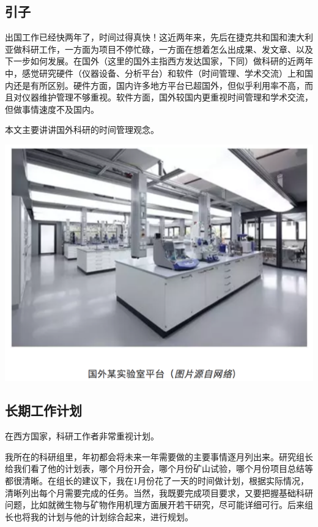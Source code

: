 \documentclass[
]{book}
\begin{document}
\hypertarget{ux5f15ux5b50}{%
\subsection{引子}\label{ux5f15ux5b50}}

出国工作已经快两年了，时间过得真快！这近两年来，先后在捷克共和国和澳大利亚做科研工作，一方面为项目不停忙碌，一方面在想着怎么出成果、发文章、以及下一步如何发展。在国外（这里的国外主指西方发达国家，下同）做科研的近两年中，感觉研究硬件（仪器设备、分析平台）和软件（时间管理、学术交流）上和国内还是有所区别。硬件方面，国内许多地方平台已超国外，但似乎利用率不高，而且对仪器维护管理不够重视。软件方面，国外较国内更重视时间管理和学术交流，但做事情速度不及国内。

本文主要讲讲国外科研的时间管理观念。

\includegraphics[width=8.33in]{images/osre1}

\hypertarget{ux957fux671fux5de5ux4f5cux8ba1ux5212}{%
\subsection{长期工作计划}\label{ux957fux671fux5de5ux4f5cux8ba1ux5212}}

在西方国家，科研工作者非常重视计划。

我所在的科研组里，年初都会将未来一年需要做的主要事情逐月列出来。研究组长给我们看了他的计划表，哪个月份开会，哪个月份矿山试验，哪个月份项目总结等都很清晰。在组长的建议下，我在1月份花了一天的时间做计划，根据实际情况，清晰列出每个月需要完成的任务。当然，我既要完成项目要求，又要把握基础科研问题，比如就微生物与矿物作用机理方面展开若干研究，尽可能详细可行。后来组长也将我的计划与他的计划综合起来，进行规划。
\end{document}
